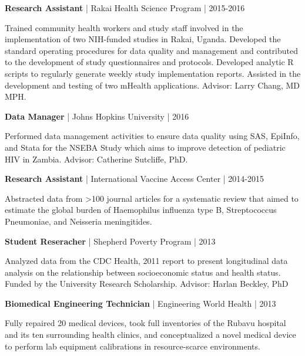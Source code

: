 \documentclass[10pt]{article}
\newcommand{\halfblankline}{\quad\vspace{-0.5\baselineskip}\pagebreak[3]}
\begin{document}
\textbf{Research Assistant} | Rakai Health Science Program | 2015-2016
\begin{innerlist}
    \item Trained community health workers and study staff involved
    in the implementation of two NIH-funded studies in Rakai, Uganda.
    Developed the standard operating procedures for data quality
    and management and contributed to the development of study
    questionnaires and protocols. Developed analytic R scripts to
    regularly generate weekly study implementation reports.
    Assisted in the development and testing of two mHealth applications.
    Advisor: Larry Chang, MD MPH.
\end{innerlist}

\halfblankline

\textbf{Data Manager} | Johns Hopkins University | 2016
\begin{innerlist}
    \item Performed data management activities to ensure data quality
    using SAS, EpiInfo, and Stata for the NSEBA Study which aims to
    improve detection of pediatric HIV in Zambia. Advisor: Catherine
    Sutcliffe, PhD.
\end{innerlist}

\halfblankline

\textbf{Research Assistant} | International Vaccine Access Center | 2014-2015
\begin{innerlist}
    \item	Abstracted data from >100 journal articles for a
    systematic review that aimed to estimate the
    global burden of Haemophilus influenza type B,
    Streptococcus Pneumoniae, and Neisseria meningitides.
\end{innerlist}

\halfblankline


\textbf{Student Reseracher} | Shepherd Poverty Program | 2013
\begin{innerlist}
    \item Analyzed data from the CDC Health, 2011 report to present
    longitudinal data analysis on the relationship between
    socioeconomic status and health status. Funded by the University
    Research Scholarship. Advisor: Harlan Beckley, PhD
\end{innerlist}

\halfblankline

\textbf{Biomedical Engineering Technician} | Engineering World Health | 2013
\begin{innerlist}
    \item Fully repaired 20 medical devices, took full inventories of the
    Rubavu hospital and its ten surrounding health clinics, and
    conceptualized a novel medical device to perform lab equipment
    calibrations in resource-scarce environments.
\end{innerlist}
\end{document}
